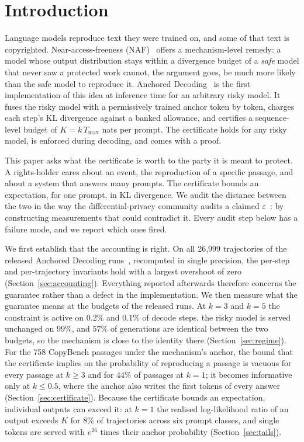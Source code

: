 \section{Introduction}\label{sec:intro}

Language models reproduce text they were trained on, and some of that text is copyrighted. Near-access-freeness (NAF)~\cite{vyas2023provable} offers a mechanism-level remedy: a model whose output distribution stays within a divergence budget of a \emph{safe} model that never saw a protected work cannot, the argument goes, be much more likely than the safe model to reproduce it. Anchored Decoding~\cite{he2026anchored} is the first implementation of this idea at inference time for an arbitrary risky model. It fuses the risky model with a permissively trained anchor token by token, charges each step's KL divergence against a banked allowance, and certifies a sequence-level budget of $K = k\,T_{\max}$ nats per prompt. The certificate holds for any risky model, is enforced during decoding, and comes with a proof.

This paper asks what the certificate is worth to the party it is meant to protect. A rights-holder cares about an event, the reproduction of a specific passage, and about a system that answers many prompts. The certificate bounds an expectation, for one prompt, in KL divergence. We audit the distance between the two in the way the differential-privacy community audits a claimed $\varepsilon$~\cite{jagielski2020auditing,nasr2023tight,steinke2023privacy}: by constructing measurements that could contradict it. Every audit step below has a failure mode, and we report which ones fired.

We first establish that the accounting is right. On all 26{,}999 trajectories of the released Anchored Decoding runs~\cite{vijayavallabh2026audit}, recomputed in single precision, the per-step and per-trajectory invariants hold with a largest overshoot of zero (Section~\ref{sec:accounting}). Everything reported afterwards therefore concerns the guarantee rather than a defect in the implementation. We then measure what the guarantee means at the budgets of the released runs. At $k=3$ and $k=5$ the constraint is active on $0.2\%$ and $0.1\%$ of decode steps, the risky model is served unchanged on $99\%$, and $57\%$ of generations are identical between the two budgets, so the mechanism is close to the identity there (Section~\ref{sec:regime}). For the 758 CopyBench passages under the mechanism's anchor, the bound that the certificate implies on the probability of reproducing a passage is vacuous for every passage at $k \ge 3$ and for $44\%$ of passages at $k=1$; it becomes informative only at $k \le 0.5$, where the anchor also writes the first tokens of every answer (Section~\ref{sec:certificate}). Because the certificate bounds an expectation, individual outputs can exceed it: at $k=1$ the realised log-likelihood ratio of an output exceeds $K$ for $8\%$ of trajectories across six prompt classes, and single tokens are served with $e^{26}$ times their anchor probability (Section~\ref{sec:tails}).

